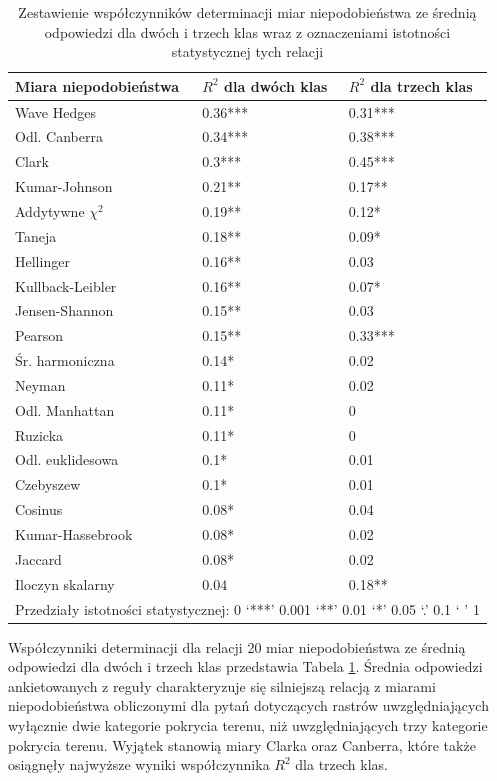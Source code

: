 \documentclass{amuthesis}
\begin{document}
\hypertarget{tbl-corr_table_fixed}{}
\begin{table}
\caption{\label{tbl-corr_table_fixed}Zestawienie współczynników determinacji miar niepodobieństwa ze średnią
odpowiedzi dla dwóch i trzech klas wraz z oznaczeniami istotności
statystycznej tych relacji }\tabularnewline

\centering
\begin{tabular}{lll}
\toprule
Miara niepodobieństwa & $R^2$ dla dwóch klas & $R^2$ dla trzech klas\\
\midrule
Wave Hedges & 0.36*** & 0.31***\\
Odl. Canberra & 0.34*** & 0.38***\\
Clark & 0.3*** & 0.45***\\
Kumar-Johnson & 0.21** & 0.17**\\
Addytywne $\chi^2$ & 0.19** & 0.12*\\
\addlinespace
Taneja & 0.18** & 0.09*\\
Hellinger & 0.16** & 0.03\\
Kullback-Leibler & 0.16** & 0.07*\\
Jensen-Shannon & 0.15** & 0.03\\
Pearson & 0.15** & 0.33***\\
\addlinespace
Śr. harmoniczna & 0.14* & 0.02\\
Neyman & 0.11* & 0.02\\
Odl. Manhattan & 0.11* & 0\\
Ruzicka & 0.11* & 0\\
Odl. euklidesowa & 0.1* & 0.01\\
\addlinespace
Czebyszew & 0.1* & 0.01\\
Cosinus & 0.08* & 0.04\\
Kumar-Hassebrook & 0.08* & 0.02\\
Jaccard & 0.08* & 0.02\\
Iloczyn skalarny & 0.04 & 0.18**\\
\bottomrule
\multicolumn{3}{l}{\rule{0pt}{1em}Przedziały istotności statystycznej:  0 ‘***’ 0.001 ‘**’ 0.01 ‘*’ 0.05 ‘.’ 0.1 ‘ ’ 1}\\
\end{tabular}
\end{table}

Współczynniki determinacji dla relacji 20 miar niepodobieństwa ze
średnią odpowiedzi dla dwóch i trzech klas przedstawia Tabela
\ref{tbl-corr_table_fixed}. Średnia odpowiedzi ankietowanych z reguły
charakteryzuje się silniejszą relacją z miarami niepodobieństwa
obliczonymi dla pytań dotyczących rastrów uwzględniających wyłącznie
dwie kategorie pokrycia terenu, niż uwzględniających trzy kategorie
pokrycia terenu. Wyjątek stanowią miary Clarka oraz Canberra, które
także osiągnęły najwyższe wyniki współczynnika \(R^2\) dla trzech klas.
\end{document}

